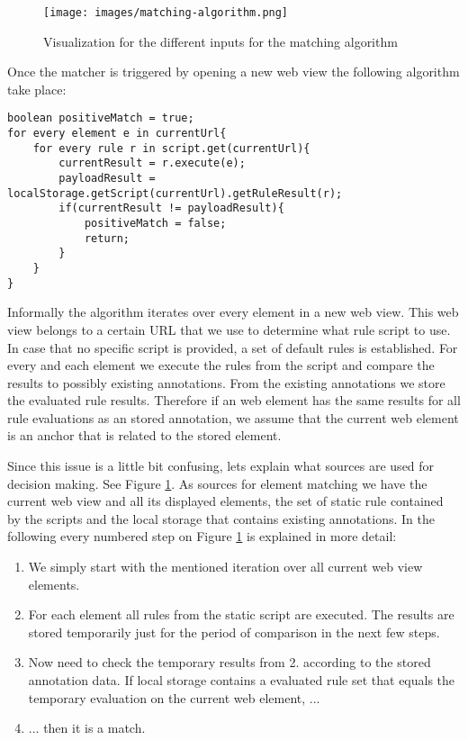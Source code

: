\begin{figure}\centering
	\texttt{[image: images/matching-algorithm.png]}
\caption{Visualization for the different inputs for the matching algorithm}
\label{matching-algorithm}
\end{figure}

Once the matcher is triggered by opening a new web view the following algorithm take place:
\begin{lstlisting}
boolean positiveMatch = true;
for every element e in currentUrl{
	for every rule r in script.get(currentUrl){
		currentResult = r.execute(e);
		payloadResult = localStorage.getScript(currentUrl).getRuleResult(r);
		if(currentResult != payloadResult){
			positiveMatch = false;
			return;
		}
	}
}
\end{lstlisting}

Informally the algorithm iterates over every element in a new web view. This web view belongs to a certain URL that we use to determine what rule script to use. In case that no specific script is provided, a set of default rules is established. For every and each element we execute the rules from the script and compare the results to possibly existing annotations. From the existing annotations we store the evaluated rule results. Therefore if an web element has the same results for all rule evaluations as an stored annotation, we assume that the current web element is an anchor that is related to the stored element. 

Since this issue is a little bit confusing, lets explain what sources are used for decision making. See Figure \ref{matching-algorithm}. As sources for element matching we have the current web view and all its displayed elements, the set of static rule contained by the scripts and the local storage that contains existing annotations. In the following every numbered step on Figure \ref{matching-algorithm} is explained in more detail:

\begin{enumerate}
\item We simply start with the mentioned iteration over all current web view elements. 

\item For each element all rules from the static script are executed. The results are stored temporarily just for the period of comparison in the next few steps.

\item Now need to check the temporary results from 2. according to the stored annotation data. If local storage contains a evaluated rule set that equals the temporary evaluation on the current web element, ...

\item ... then it is a match. 
\end{enumerate}

